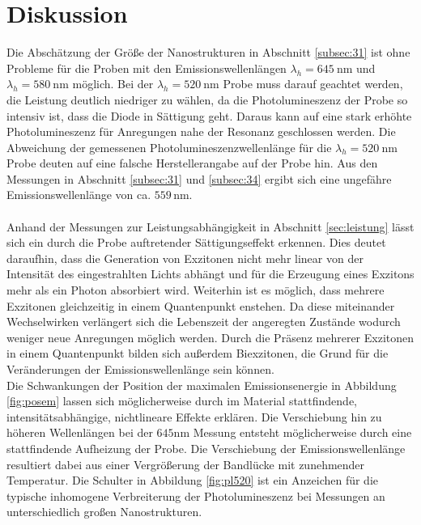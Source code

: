 \newpage
\section{Diskussion}
Die Abschätzung der Größe der Nanostrukturen in Abschnitt \ref{subsec:31} ist ohne Probleme
für die Proben mit den Emissionswellenlängen $\lambda_h = \SI{645}{\nano\meter}$
und $\lambda_h = \SI{580}{\nano\meter}$ möglich. Bei der $\lambda_h = \SI{520}{\nano\meter}$
Probe muss darauf geachtet werden, die Leistung deutlich niedriger zu wählen, da die Photolumineszenz der Probe
so intensiv ist, dass die Diode in Sättigung geht. Daraus kann auf eine stark erhöhte Photolumineszenz für
Anregungen nahe der Resonanz geschlossen werden. Die Abweichung der gemessenen Photolumineszenzwellenlänge für die $\lambda_h = \SI{520}{\nano\meter}$ Probe deuten auf eine falsche Herstellerangabe auf der Probe hin. Aus den Messungen in Abschnitt \ref{subsec:31} und \ref{subsec:34} ergibt sich eine ungefähre Emissionswellenlänge von ca. $559\,\si{\nano\meter}$.\\
\\
Anhand der Messungen zur Leistungsabhängigkeit in Abschnitt \ref{sec:leistung} lässt sich ein
durch die Probe auftretender Sättigungseffekt erkennen. Dies deutet daraufhin, dass die Generation von Exzitonen nicht mehr linear von der Intensität des eingestrahlten Lichts abhängt und für die Erzeugung eines Exzitons mehr als ein Photon absorbiert wird. Weiterhin ist es möglich, dass mehrere Exzitonen gleichzeitig in einem Quantenpunkt enstehen. Da diese miteinander Wechselwirken verlängert sich die Lebenszeit der angeregten Zustände wodurch weniger neue Anregungen möglich werden. Durch die Präsenz mehrerer Exzitonen in einem Quantenpunkt bilden sich außerdem Biexzitonen, die Grund für die Veränderungen der Emissionswellenlänge sein können.\\
Die Schwankungen der Position der maximalen Emissionsenergie in Abbildung \ref{fig:posem}
lassen sich möglicherweise durch im Material stattfindende, intensitätsabhängige, nichtlineare
Effekte erklären. Die Verschiebung hin zu höheren Wellenlängen bei der $645\si{\nano\meter}$ Messung entsteht möglicherweise durch eine stattfindende Aufheizung der Probe. Die Verschiebung der Emissionswellenlänge resultiert dabei aus einer Vergrößerung der Bandlücke mit zunehmender Temperatur. \cite{thermik}
Die Schulter in Abbildung \ref{fig:pl520} ist ein Anzeichen für die typische inhomogene Verbreiterung der Photolumineszenz bei Messungen an unterschiedlich großen Nanostrukturen.\\
